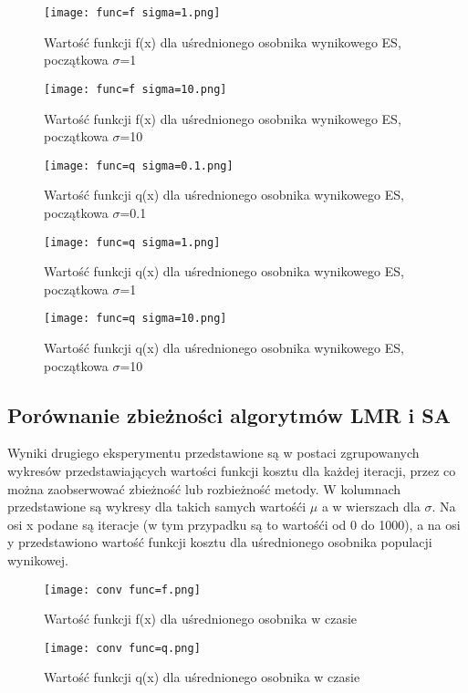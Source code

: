 \documentclass{article}
\begin{document}
\begin{figure}[H]
\caption{Wartość funkcji f(x) dla uśrednionego osobnika wynikowego ES, początkowa $\sigma$=1}
\centering
\texttt{[image: func=f sigma=1.png]}
\end{figure}

\begin{figure}[H]
\caption{Wartość funkcji f(x) dla uśrednionego osobnika wynikowego ES, początkowa $\sigma$=10}
\centering
\texttt{[image: func=f sigma=10.png]}
\end{figure}

\begin{figure}[H]
\caption{Wartość funkcji q(x) dla uśrednionego osobnika wynikowego ES, początkowa $\sigma$=0.1}
\centering
\texttt{[image: func=q sigma=0.1.png]}
\end{figure}

\begin{figure}[H]
\caption{Wartość funkcji q(x) dla uśrednionego osobnika wynikowego ES, początkowa $\sigma$=1}
\centering
\texttt{[image: func=q sigma=1.png]}
\end{figure}

\begin{figure}[H]
\caption{Wartość funkcji q(x) dla uśrednionego osobnika wynikowego ES, początkowa $\sigma$=10}
\centering
\texttt{[image: func=q sigma=10.png]}
\end{figure}

\subsection{Porównanie zbieżności algorytmów LMR i SA}

Wyniki drugiego eksperymentu przedstawione są w postaci zgrupowanych wykresów przedstawiających wartości funkcji kosztu dla każdej iteracji, przez co można zaobserwować zbieżność lub rozbieżność metody. W kolumnach przedstawione są wykresy dla takich samych wartośći $\mu$ a w wierszach dla $\sigma$. Na osi x podane są iteracje (w tym przypadku są to wartośći od 0 do 1000), a na osi y przedstawiono wartość funkcji kosztu dla uśrednionego osobnika populacji wynikowej.

\begin{figure}[H]
\caption{Wartość funkcji f(x) dla uśrednionego osobnika w czasie}
\centering
\texttt{[image: conv func=f.png]}
\end{figure}

\begin{figure}[H]
\caption{Wartość funkcji q(x) dla uśrednionego osobnika w czasie}
\centering
\texttt{[image: conv func=q.png]}
\end{figure}
\end{document}
